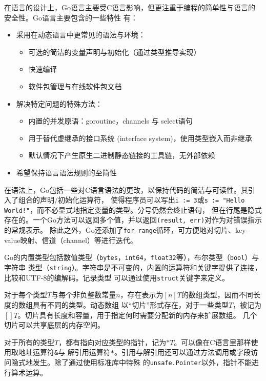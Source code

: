 \documentclass[12pt]{article}
\begin{document}
\indent{}在语言的设计上，Go语言主要受C语言影响，但更注重于编程的简单性与语言的安全性。Go语言主要包含的一些特性
有：
\begin{itemize}
    \item 采用在动态语言中更常见的语法与环境：
        \begin{itemize}
            \item 可选的简洁的变量声明与初始化（通过类型推导实现）
            \item 快速编译
            \item 软件包管理与在线软件包文档
        \end{itemize}
    \item 解决特定问题的特殊方法：
        \begin{itemize}
            \item 内置的并发原语：goroutine，channels 与 select语句
            \item 用于替代虚继承的接口系统 (interface system)，使用类型嵌入而非继承
            \item 默认情况下产生原生二进制静态链接的工具链，无外部依赖
        \end{itemize}
    \item 希望保持语言语法规则的至简性
\end{itemize}

\indent{}在语法上，Go包括一些对C语言语法的更改，以保持代码的简洁与可读性。其引入了组合的声明/初始化运算符，
使得程序员可以写出\texttt{i := 3}或\texttt{s := "Hello World!"}，而不必显式地指定变量的类型。分号仍然会终止语句，
但在行尾是隐式存在的。一个Go方法可以返回多个值，并以返回\texttt{(result, err)}对作为对错误指示的常规表示。
除此之外，Go还添加了\texttt{for-range}循环，可方便地对切片、key-value映射、信道（channel）等进行迭代。

\indent{}Go的内置类型包括数值类型（\texttt{bytes}，\texttt{int64}，\texttt{float32}等），布尔类型（\texttt{bool}）与字符串
类型（\texttt{string}）。字符串是不可变的，内置的运算符和关键字提供了连接，比较和UTF-8的编解码。记录类型
可以通过使用\texttt{struct}关键字来定义。

\indent{}对于每个类型$T$与每个非负整数常量$n$，存在表示为$[n]T$的数组类型，因而不同长度的数组具有不同的类型。动态数组
以“切片”形式存在，对于一些类型$T$，被记为$[]T$。切片具有长度和容量，用于指定何时需要分配新的内存来扩展数组。
几个切片可以共享底层的内存空间。

\indent{}对于所有的类型$T$，都有指向对应类型的指针，记为$*T$。可以像在C语言里那样使用取地址运算符\texttt{\&}与
解引用运算符\texttt{*}。引用与解引用还可以通过方法调用或字段访问隐式地发生。除了通过使用标准库中特殊
的\texttt{unsafe.Pointer}以外，指针不能进行算术运算。
\end{document}
